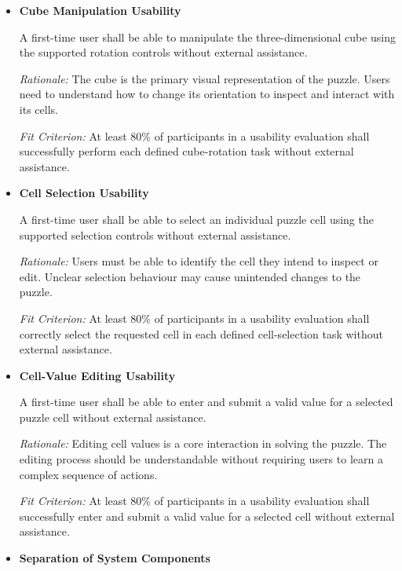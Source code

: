 \documentclass[12pt]{article}
\newcounter{nfrnum} %
\begin{document}
\begin{itemize}
\item[NFR\refstepcounter{nfrnum}\thenfrnum
\label{NFR_4}:]
\textbf{Cube Manipulation Usability}

A first-time user shall be able to manipulate the three-dimensional
cube using the supported rotation controls without external
assistance.

\textit{Rationale:} The cube is the primary visual representation
of the puzzle. Users need to understand how to change its
orientation to inspect and interact with its cells.

\textit{Fit Criterion:} At least 80\% of participants in a
usability evaluation shall successfully perform each defined
cube-rotation task without external assistance.


\item[NFR\refstepcounter{nfrnum}\thenfrnum
\label{NFR_5}:]
\textbf{Cell Selection Usability}

A first-time user shall be able to select an individual
puzzle cell using the supported selection controls without
external assistance.

\textit{Rationale:} Users must be able to identify the cell
they intend to inspect or edit. Unclear selection behaviour
may cause unintended changes to the puzzle.

\textit{Fit Criterion:} At least 80\% of participants in a
usability evaluation shall correctly select the requested
cell in each defined cell-selection task without external
assistance.


\item[NFR\refstepcounter{nfrnum}\thenfrnum
\label{NFR_6}:]
\textbf{Cell-Value Editing Usability}

A first-time user shall be able to enter and submit a valid
value for a selected puzzle cell without external assistance.

\textit{Rationale:} Editing cell values is a core interaction
in solving the puzzle. The editing process should be
understandable without requiring users to learn a complex
sequence of actions.

\textit{Fit Criterion:} At least 80\% of participants in a
usability evaluation shall successfully enter and submit
a valid value for a selected cell without external assistance.



\item[NFR\refstepcounter{nfrnum}\thenfrnum
\label{NFR_7}:]
\textbf{Separation of System Components}


\end{itemize}
\end{document}
